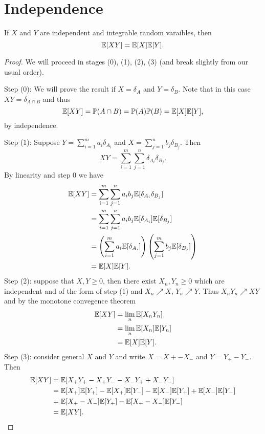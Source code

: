 \section{Independence}
\begin{thrm}
    If $X$ and $Y$ are independent and integrable random varaibles, then 
    \[{\mathbb{E}}[XY] = {\mathbb{E}}[X]{\mathbb{E}}[Y]. \]
\end{thrm}
\begin{proof}
    We will proceed in stages (0), (1), (2), (3) (and break slightly from our usual order). 

    Step (0): We will prove the result if $X=\delta_A$ and $Y=\delta_B$. Note that in this case $XY = \delta_{A\cap B}$ and thus 
    \[{\mathbb{E}}[XY] = {\mathbb{P}}(A\cap B) = {\mathbb{P}}(A){\mathbb{P}}(B) = {\mathbb{E}}[X]{\mathbb{E}}[Y], \]
    by independence. 

    Step (1): Suppose $Y=\sum_{i=1}^m a_i \delta_{A_i}$ and $X = \sum_{j=1}^n b_j \delta_{B_j}$. Then 
    \[XY = \sum_{i=1}^m\sum_{j=1}^n \delta_{A_i}\delta_{B_j}.\]
    By linearity and step 0 we have
    \begin{align*}
        {\mathbb{E}}[XY]&=\sum_{i=1}^m \sum_{j=1}^n a_ib_j {\mathbb{E}}[\delta_{A_i}\delta_{B_j}]\\
        &=\sum_{i=1}^m \sum_{j=1}^n a_ib_j {\mathbb{E}}[\delta_{A_i}]{\mathbb{E}}[\delta_{B_j}]\\
        &=\left(\sum_{i=1}^m a_i{\mathbb{E}}[\delta_{A_i}]\right)\left(\sum_{j=1}^m b_j{\mathbb{E}}[\delta_{B_j}]\right)\\
        &={\mathbb{E}}[X]{\mathbb{E}}[Y].
    \end{align*}
    Step (2): suppose that $X,Y \ge 0$, then there exist $X_n,Y_n \ge 0$ which are independent and of the form of step (1) and $X_n \nearrow X$, $Y_n \nearrow Y$. Thus $X_nY_n \nearrow XY$ and by the monotone convegence theorem
    \begin{align*}
        {\mathbb{E}}[XY] &= \lim_n {\mathbb{E}}[X_nY_n]\\
        &=\lim_n {\mathbb{E}}[X_n]{\mathbb{E}}[Y_n]\\
        &={\mathbb{E}}[X]{\mathbb{E}}[Y].
    \end{align*}
    Step (3): consider general $X$ and $Y$ and write $X=X+-X_-$ and $Y=Y_+-Y_-$. Then 
    \begin{align*}
        {\mathbb{E}}[XY] &= {\mathbb{E}}[X_+Y_+-X_+Y_--X_-Y_++X_-Y_-]\\
        &= {\mathbb{E}}[X_+]{\mathbb{E}}[Y_+]-{\mathbb{E}}[X_+]{\mathbb{E}}[Y_-]-{\mathbb{E}}[X_-]{\mathbb{E}}[Y_+]+{\mathbb{E}}[X_-]{\mathbb{E}}[Y_-]\\
        &= {\mathbb{E}}[X_+-X_-]{\mathbb{E}}[Y_+]-{\mathbb{E}}[X_+-X_-]{\mathbb{E}}[Y_-]\\
        &={\mathbb{E}}[XY].\qedhere
    \end{align*}
\end{proof}
